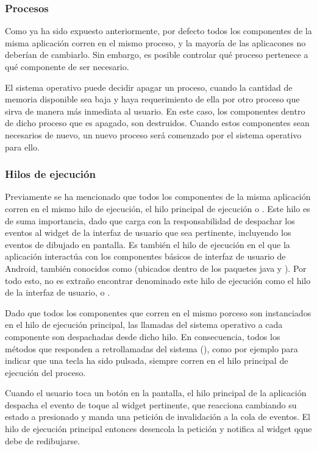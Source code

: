 \subsubsection{Procesos}

Como ya ha sido expuesto anteriormente, por defecto todos los componentes de la misma aplicación corren en el mismo proceso, y la mayoría de las aplicacones no deberían de cambiarlo. Sin embargo, es posible controlar qué proceso pertenece a qué componente de ser necesario.

El sistema operativo puede decidir apagar un proceso, cuando la cantidad de memoria disponible sea baja y haya requerimiento de ella por otro proceso que sirva de manera más inmediata al usuario. En este caso, los componentes dentro de dicho proceso que es apagado, son destruidos. Cuando estos componentes sean necesarios de nuevo, un nuevo proceso será comenzado por el sistema operativo para ello.

\subsubsection{Hilos de ejecución}

Previamente se ha mencionado que todos los componentes de la misma aplicación corren en el mismo hilo de ejecución, el hilo principal de ejecución o . Este hilo es de suma importancia, dado que carga con la responsabilidad de despachar los eventos al widget de la interfaz de usuario que sea pertinente, incluyendo los eventos de dibujado en pantalla. Es también el hilo de ejecución en el que la aplicación interactúa con los componentes básicos de interfaz de usuario de Android, también conocidos como  (ubicados dentro de los paquetes java  y ). Por todo esto, no es extraño encontrar denominado este hilo de ejecución como el hilo de la interfaz de usuario, o .

Dado que todos los componentes que corren en el mismo porceso son instanciados en el hilo de ejecución principal, las llamadas del sistema operativo a cada componente son despachadas desde dicho hilo. En consecuencia, todos los métodos que responden a retrollamadas del sistema (), como por ejemplo para indicar que una tecla ha sido pulsada, siempre corren en el hilo principal de ejecución del proceso.

Cuando el usuario toca un botón en la pantalla, el hilo principal de la aplicación despacha el evento de toque al widget pertinente, que reacciona cambiando su estado a presionado y manda una petición de invalidación a la cola de eventos. El hilo de ejecución principal entonces desencola la petición y notifica al widget qque debe de redibujarse.

